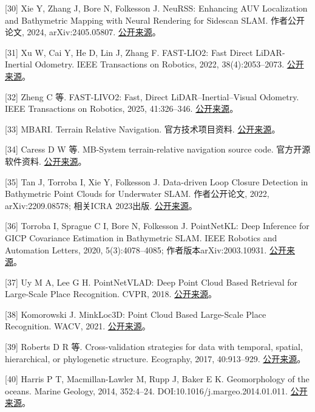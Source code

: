 {[}30{]} Xie Y, Zhang J, Bore N, Folkesson J. NeuRSS: Enhancing AUV Localization and Bathymetric Mapping with Neural Rendering for Sidescan SLAM. 作者公开论文, 2024, arXiv:2405.05807. \href{https://arxiv.org/abs/2405.05807}{公开来源}。

{[}31{]} Xu W, Cai Y, He D, Lin J, Zhang F. FAST-LIO2: Fast Direct LiDAR-Inertial Odometry. IEEE Transactions on Robotics, 2022, 38(4):2053--2073. \href{https://arxiv.org/abs/2107.06829}{公开来源}。

{[}32{]} Zheng C 等. FAST-LIVO2: Fast, Direct LiDAR--Inertial--Visual Odometry. IEEE Transactions on Robotics, 2025, 41:326--346. \href{https://arxiv.org/abs/2408.14035}{公开来源}。

{[}33{]} MBARI. Terrain Relative Navigation. 官方技术项目资料. \href{https://www.mbari.org/project/terrain-relative-navigation/}{公开来源}。

{[}34{]} Caress D W 等. MB-System terrain-relative navigation source code. 官方开源软件资料. \href{https://github.com/dwcaress/MB-System}{公开来源}。

{[}35{]} Tan J, Torroba I, Xie Y, Folkesson J. Data-driven Loop Closure Detection in Bathymetric Point Clouds for Underwater SLAM. 作者公开论文, 2022, arXiv:2209.08578; 相关ICRA 2023出版. \href{https://arxiv.org/abs/2209.08578}{公开来源}。

{[}36{]} Torroba I, Sprague C I, Bore N, Folkesson J. PointNetKL: Deep Inference for GICP Covariance Estimation in Bathymetric SLAM. IEEE Robotics and Automation Letters, 2020, 5(3):4078--4085; 作者版本arXiv:2003.10931. \href{https://arxiv.org/abs/2003.10931}{公开来源}。

{[}37{]} Uy M A, Lee G H. PointNetVLAD: Deep Point Cloud Based Retrieval for Large-Scale Place Recognition. CVPR, 2018. \href{https://arxiv.org/abs/1804.03492}{公开来源}。

{[}38{]} Komorowski J. MinkLoc3D: Point Cloud Based Large-Scale Place Recognition. WACV, 2021. \href{https://arxiv.org/abs/2011.04530}{公开来源}。

{[}39{]} Roberts D R 等. Cross-validation strategies for data with temporal, spatial, hierarchical, or phylogenetic structure. Ecography, 2017, 40:913--929. \href{https://doi.org/10.1111/ecog.02881}{公开来源}。

{[}40{]} Harris P T, Macmillan-Lawler M, Rupp J, Baker E K. Geomorphology of the oceans. Marine Geology, 2014, 352:4--24. DOI:10.1016/j.margeo.2014.01.011. \href{https://bluehabitats.org/}{公开来源}。

